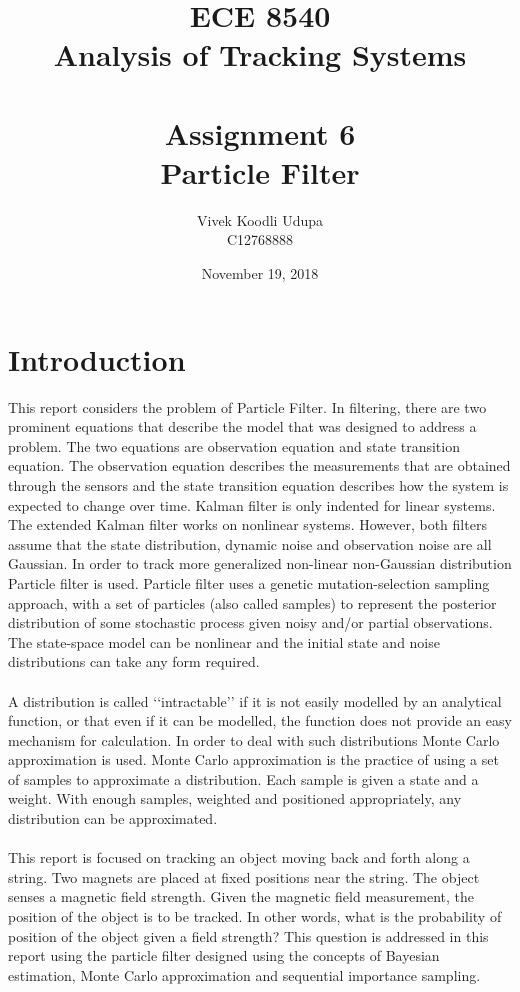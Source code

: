 \documentclass[12pt]{article}
\title{ECE 8540 \\ Analysis of Tracking Systems \\ \quad \\
	Assignment 6 \\ Particle Filter}
\author{Vivek Koodli Udupa \\ C12768888}
\date{November 19, 2018 }
\begin{document}
\begin{mdframed}
\maketitle
\end{mdframed}


\section{Introduction}
This report considers the problem of Particle Filter. In filtering, there are two prominent equations that describe the model that was designed to address a problem. The two equations are observation equation and state transition equation. The observation equation describes the measurements that are obtained through the sensors and the state transition equation describes how the system is expected to change over time. Kalman filter is only indented for linear systems. The extended Kalman filter works on nonlinear systems. However, both filters assume that the state distribution, dynamic noise and observation noise are all Gaussian. In order to track more generalized non-linear non-Gaussian distribution Particle filter is used. Particle filter uses a genetic mutation-selection sampling approach, with a set of particles (also called samples) to represent the posterior distribution of some stochastic process given noisy and/or partial observations. The state-space model can be nonlinear and the initial state and noise distributions can take any form required.\\ 
\\ \indent
A distribution is called \lq\lq{intractable}\rq\rq{} if it is not easily modelled by an analytical function, or that even if it can be modelled, the function does not provide an easy mechanism for calculation. In order to deal with such distributions Monte Carlo approximation is used. Monte Carlo approximation is the practice of using a set of samples to approximate a distribution. Each sample is given a state and a weight. With enough samples, weighted and positioned appropriately, any distribution can be approximated.  \\ 
\\ \indent
This report is focused on tracking an object moving back and forth along a string. Two magnets are placed at fixed positions near the string. The object senses a magnetic field strength. Given the magnetic field measurement, the position of the object is to be tracked. In other words, what is the probability of position of the object given a field strength? This question is addressed in this report using the particle filter designed using the concepts of Bayesian estimation, Monte Carlo approximation and sequential importance sampling.  
\end{document}
